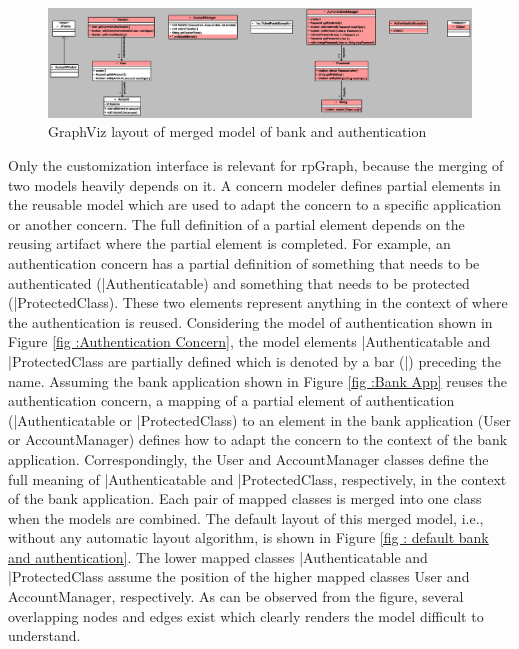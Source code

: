 \begin{figure}
    	\includegraphics[width=\linewidth]{gv_bank.PNG}
        \caption{GraphViz layout of merged model of bank and authentication}
        \label{figure : merged bank}
\end{figure}

Only the customization interface is relevant for rpGraph, because the merging of two models heavily depends on it. A concern modeler defines partial elements in the reusable model which are used to adapt the concern to a specific application or another concern. The full definition of a partial element depends on the reusing artifact where the partial element is completed. For example, an authentication concern has a partial definition of something that needs to be authenticated (|Authenticatable) and something that needs to be protected (|ProtectedClass). These two elements represent anything in the context of where the authentication is reused. Considering the model of authentication shown in Figure \ref{fig :Authentication Concern}, the model elements |Authenticatable and |ProtectedClass are partially defined which is denoted by a bar (|) preceding the name. Assuming the bank application shown in Figure \ref{fig :Bank App} reuses the authentication concern, a mapping of a partial element of authentication (|Authenticatable or |ProtectedClass) to an element in the bank application (User or AccountManager) defines how to adapt the concern to the context of the bank application. Correspondingly, the User and AccountManager classes define the full meaning of |Authenticatable and |ProtectedClass, respectively, in the context of the bank application. Each pair of mapped classes is merged into one class when the models are combined.  The default layout of this merged model, i.e., without any automatic layout algorithm, is shown in Figure \ref{fig : default bank and authentication}. The lower mapped classes |Authenticatable and |ProtectedClass assume the position of the higher mapped classes User and AccountManager, respectively. As can be observed from the figure, several overlapping nodes and edges exist which clearly renders the model difficult to understand.

